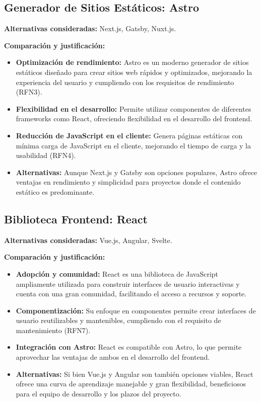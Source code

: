 \subsection{Generador de Sitios Estáticos: Astro}

\textbf{Alternativas consideradas:} Next.js, Gatsby, Nuxt.js.

\textbf{Comparación y justificación:}

\begin{itemize} 
	\item \textbf{Optimización de rendimiento:} Astro es un moderno generador de sitios estáticos diseñado para crear sitios web rápidos y optimizados, mejorando la experiencia del usuario y cumpliendo con los requisitos de rendimiento (RFN3).
	
	\item \textbf{Flexibilidad en el desarrollo:} Permite utilizar componentes de diferentes frameworks como React, ofreciendo flexibilidad en el desarrollo del frontend.
	
	\item \textbf{Reducción de JavaScript en el cliente:} Genera páginas estáticas con mínima carga de JavaScript en el cliente, mejorando el tiempo de carga y la usabilidad (RFN4).
	
	\item \textbf{Alternativas:} Aunque Next.js y Gatsby son opciones populares, Astro ofrece ventajas en rendimiento y simplicidad para proyectos donde el contenido estático es predominante.
	

\end{itemize}

\subsection{Biblioteca Frontend: React}

\textbf{Alternativas consideradas:} Vue.js, Angular, Svelte.

\textbf{Comparación y justificación:}

\begin{itemize} 
	\item \textbf{Adopción y comunidad:} React es una biblioteca de JavaScript ampliamente utilizada para construir interfaces de usuario interactivas y cuenta con una gran comunidad, facilitando el acceso a recursos y soporte.
	
\item \textbf{Componentización:} Su enfoque en componentes permite crear interfaces de usuario reutilizables y mantenibles, cumpliendo con el requisito de mantenimiento (RFN7).

\item \textbf{Integración con Astro:} React es compatible con Astro, lo que permite aprovechar las ventajas de ambos en el desarrollo del frontend.

\item \textbf{Alternativas:} Si bien Vue.js y Angular son también opciones viables, React ofrece una curva de aprendizaje manejable y gran flexibilidad, beneficiosos para el equipo de desarrollo y los plazos del proyecto.
\end{itemize}
